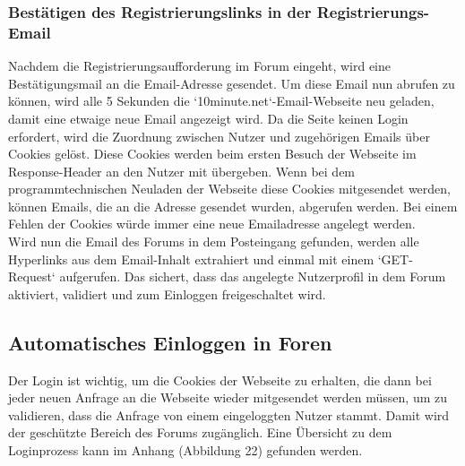 \subsubsection{Bestätigen des Registrierungslinks in der Registrierungs-Email}
Nachdem die Registrierungsaufforderung im Forum eingeht, wird eine Bestätigungsmail an die Email-Adresse gesendet.
Um diese Email nun abrufen zu können, wird alle 5 Sekunden die `10minute.net`-Email-Webseite neu geladen, damit eine etwaige neue Email angezeigt wird. Da die Seite keinen Login erfordert, wird die Zuordnung zwischen Nutzer und zugehörigen Emails über Cookies gelöst. Diese Cookies werden beim ersten Besuch der Webseite im Response-Header an den Nutzer mit übergeben. Wenn bei dem programmtechnischen Neuladen der Webseite diese Cookies mitgesendet werden, können Emails, die an die Adresse gesendet wurden, abgerufen werden. Bei einem Fehlen der Cookies würde immer eine neue Emailadresse angelegt werden.\\
Wird nun die Email des Forums in dem Posteingang gefunden, werden alle Hyperlinks aus dem Email-Inhalt extrahiert und einmal mit einem `GET-Request` aufgerufen. Das sichert, dass das angelegte Nutzerprofil in dem Forum aktiviert, validiert und zum Einloggen freigeschaltet wird.


\subsection {Automatisches Einloggen in Foren}
Der Login ist wichtig, um die Cookies der Webseite zu erhalten, die dann bei jeder neuen Anfrage an die Webseite wieder mitgesendet werden müssen, um zu validieren, dass die Anfrage von einem eingeloggten Nutzer stammt. Damit wird der geschützte Bereich des Forums zugänglich.
Eine Übersicht zu dem Loginprozess kann im Anhang (Abbildung 22) gefunden werden.

